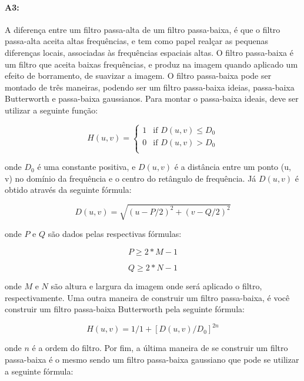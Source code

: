 \paragraph{A3:} A diferença entre um filtro passa-alta de um filtro passa-baixa, é que o filtro passa-alta aceita altas frequências, e tem como papel realçar as pequenas diferenças locais, associadas às frequências espaciais altas. O filtro passa-baixa é um filtro que aceita baixas frequências, e produz na imagem quando aplicado um efeito de borramento, de suavizar a imagem. O filtro passa-baixa pode ser montado de três maneiras, podendo ser um filtro passa-baixa ideias, passa-baixa Butterworth e passa-baixa gaussianos. Para montar o passa-baixa ideais, deve ser utilizar a seguinte função:

\[
	H(u, v) = 
	\begin{cases} 
        1 & \text{if $D(u, v) \leq D_0$}\\
        0 & \text{if $D(u, v) > D_0$}\\
   \end{cases}
\]

onde $D_0$ é uma constante positiva, e $D(u, v)$ é a distância entre um ponto (u, v) no domínio da frequência e o centro do retângulo de frequência. Já $D(u, v)$ é obtido através da seguinte fórmula:

\begin{equation}
	D(u, v) = \sqrt{(u - P / 2)^2 + (v - Q / 2)^2}
\end{equation}

onde $P$ e $Q$ são dados pelas respectivas fórmulas:

\begin{equation}
	P \geq 2 * M - 1
\end{equation}

\begin{equation}
	Q \geq 2 * N - 1
\end{equation}

onde $M$ e $N$ são altura e largura da imagem onde será aplicado o filtro, respectivamente. Uma outra maneira de construir um filtro passa-baixa, é você construir um filtro passa-baixa Butterworth pela seguinte fórmula:

\begin{equation}
	H(u , v) = 1 / 1 + [D(u, v) / D_0]^{2n}
\end{equation}

onde $n$ é a ordem do filtro. Por fim, a última maneira de se construir um filtro passa-baixa é o mesmo sendo um filtro passa-baixa gaussiano que pode se utilizar a seguinte fórmula:

